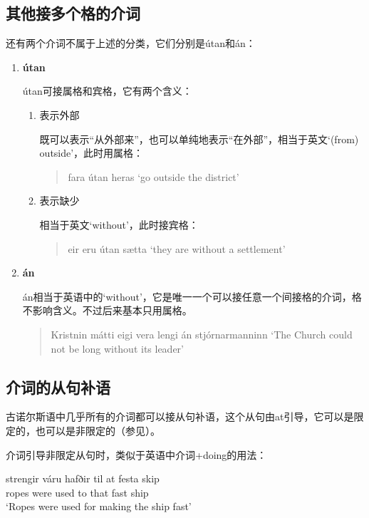 \subsection{其他接多个格的介词}
还有两个介词不属于上述的分类，它们分别是útan和án：
\begin{enumerate}[itemindent=1em, label=\textbf{\arabic*}.]
    \item \textbf{útan}

          útan可接属格和宾格，它有两个含义：
          \begin{enumerate}
              \item 表示外部

                    既可以表示“从外部来”，也可以单纯地表示“在外部”，相当于英文`(from) outside'，此时用属格：
                    \begin{quote}
                        fara útan hera\dh s `go outside the district'
                    \end{quote}

              \item 表示缺少

                    相当于英文`without'，此时接宾格：
                    \begin{quote}
                        \th eir eru útan sætta `they are without a settlement'
                    \end{quote}
          \end{enumerate}

    \item \textbf{án}

          án相当于英语中的`without'，它是唯一一个可以接任意一个间接格的介词，格不影响含义。不过后来基本只用属格。
          \begin{quote}
              Kristnin mátti eigi vera lengi án stjórnarmanninn `The Church could not be long without its leader'
          \end{quote}
\end{enumerate}

\subsection{介词的从句补语}
古诺尔斯语中几乎所有的介词都可以接从句补语，这个从句由at引导，它可以是限定的，也可以是非限定的（参见）。

介词引导非限定从句时，类似于英语中介词+doing的用法：
\begin{exe}
    \ex \gll
    strengir váru hafðir til at festa skip\\
    ropes were used to that fast ship\\
    \trans `Ropes were used for making the ship fast'
\end{exe}


